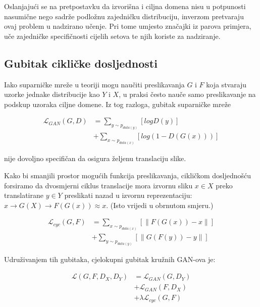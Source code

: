 \documentclass[lmodern, utf8, seminar]{fer}
\newcommand{\Lagr}{\mathcal{L}}
\begin{document}
Oslanjajući se na pretpostavku da izvorišna i ciljna domena nisu u potpunosti nasumične nego sadrže podložnu zajedničku distribuciju, inverzom pretvaraju ovaj problem u nadzirano učenje. Pri tome umjesto značajki iz parova primjera, uče zajedničke specifičnosti cijelih setova te njih koriste za nadziranje.

\subsection{Gubitak cikličke dosljednosti}
Iako suparničke mreže u teoriji mogu naučiti preslikavanja $G$ i $F$ koja stvaraju uzorke jednake distribucije kao $Y$ i $X$, u praksi često nauče samo preslikavanje na podskup uzoraka ciljne domene. Iz tog razloga, gubitak suparničke mreže 


\begin{equation}
\begin{split}
\Lagr_{GAN}(G, D) &= \sum_{y\sim p_{data(y)}}[log D(y)] \\
			     &+ \sum_{x\sim p_{data(x)}}[log(1 - D(G(x)))]
\end{split}
\end{equation}

nije dovoljno specifičan da osigura željenu translaciju slike.
\newline

Kako bi smanjili prostor mogućih funkcija preslikavanja, cikličkom dosljednošću forsiramo da dvosmjerni ciklus translacije mora izvornu sliku $x \in X$ preko translatirane $y \in Y$ preslikati nazad u izvornu reprezentaciju: $x \rightarrow G(X) \rightarrow F(G(x)) \approx x$. (Isto vrijedi u obrnutom smjeru.)

\begin{equation}
\begin{split}
\Lagr_{cyc}(G, F) &= \sum_{x\sim p_{data(x)}}[ \parallel F(G(x)) - x \parallel ] \\
			   &+ \sum_{y\sim p_{data(y)}}[ \parallel G(F(y)) - y \parallel ]
\end{split}
\end{equation}


Udruživanjem tih gubitaka, cjelokupni gubitak kružnih GAN-ova je:

\begin{equation}
\begin{split}
\Lagr(G, F, D_{X}, D_{Y}) &= \Lagr_{GAN}(G, D_{Y}) \\
			   &+ \Lagr_{GAN}(F, D_{X}) \\
			   &+ \lambda \Lagr_{cyc}(G, F)
\end{split}
\end{equation}
\end{document}
